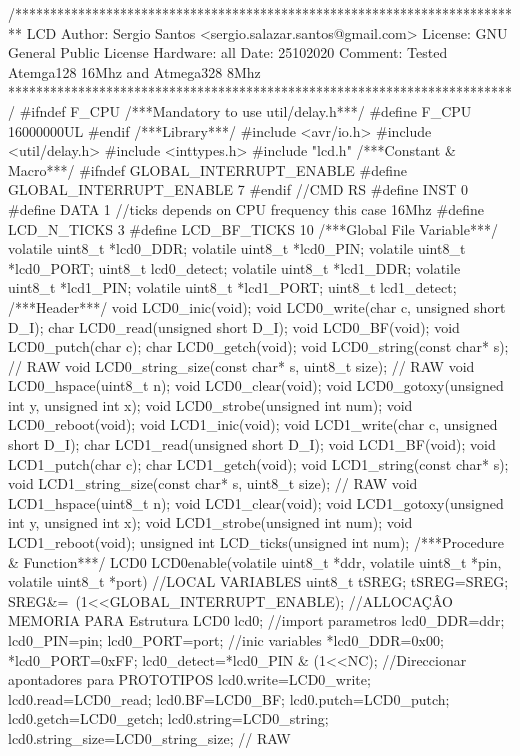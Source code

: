\begin{verbatimtab}
/*************************************************************************
LCD
Author: Sergio Santos 
<sergio.salazar.santos@gmail.com>
License: GNU General Public License
Hardware: all
Date: 25102020
Comment:
Tested Atemga128 16Mhz and Atmega328 8Mhz                    
************************************************************************/
#ifndef F_CPU
/***Mandatory to use util/delay.h***/
#define F_CPU 16000000UL
#endif
/***Library***/
#include <avr/io.h>
#include <util/delay.h>
#include <inttypes.h>
#include "lcd.h"
/***Constant & Macro***/
#ifndef GLOBAL_INTERRUPT_ENABLE
#define GLOBAL_INTERRUPT_ENABLE 7
#endif
//CMD RS
#define INST 0
#define DATA 1
//ticks depends on CPU frequency this case 16Mhz
#define LCD_N_TICKS 3
#define LCD_BF_TICKS 10
/***Global File Variable***/
volatile uint8_t *lcd0_DDR;
volatile uint8_t *lcd0_PIN;
volatile uint8_t *lcd0_PORT;
uint8_t lcd0_detect;
volatile uint8_t *lcd1_DDR;
volatile uint8_t *lcd1_PIN;
volatile uint8_t *lcd1_PORT;
uint8_t lcd1_detect;
/***Header***/
void LCD0_inic(void);
void LCD0_write(char c, unsigned short D_I);
char LCD0_read(unsigned short D_I);
void LCD0_BF(void);
void LCD0_putch(char c);
char LCD0_getch(void);
void LCD0_string(const char* s); // RAW
void LCD0_string_size(const char* s, uint8_t size); // RAW
void LCD0_hspace(uint8_t n);
void LCD0_clear(void);
void LCD0_gotoxy(unsigned int y, unsigned int x);
void LCD0_strobe(unsigned int num);
void LCD0_reboot(void);
void LCD1_inic(void);
void LCD1_write(char c, unsigned short D_I);
char LCD1_read(unsigned short D_I);
void LCD1_BF(void);
void LCD1_putch(char c);
char LCD1_getch(void);
void LCD1_string(const char* s);
void LCD1_string_size(const char* s, uint8_t size); // RAW
void LCD1_hspace(uint8_t n);
void LCD1_clear(void);
void LCD1_gotoxy(unsigned int y, unsigned int x);
void LCD1_strobe(unsigned int num);
void LCD1_reboot(void);
unsigned int LCD_ticks(unsigned int num);
/***Procedure & Function***/
LCD0 LCD0enable(volatile uint8_t *ddr, volatile uint8_t *pin, volatile uint8_t *port)
{
	//LOCAL VARIABLES
	uint8_t tSREG;
	tSREG=SREG;
	SREG&=~(1<<GLOBAL_INTERRUPT_ENABLE);
	//ALLOCAÇÂO MEMORIA PARA Estrutura
	LCD0 lcd0;
	//import parametros
	lcd0_DDR=ddr;
	lcd0_PIN=pin;
	lcd0_PORT=port;
	//inic variables
	*lcd0_DDR=0x00;
	*lcd0_PORT=0xFF;
	lcd0_detect=*lcd0_PIN & (1<<NC);
	//Direccionar apontadores para PROTOTIPOS
	lcd0.write=LCD0_write;
	lcd0.read=LCD0_read;
	lcd0.BF=LCD0_BF;
	lcd0.putch=LCD0_putch;
	lcd0.getch=LCD0_getch;
	lcd0.string=LCD0_string;
	lcd0.string_size=LCD0_string_size; // RAW
}
\end{verbatimtab}
